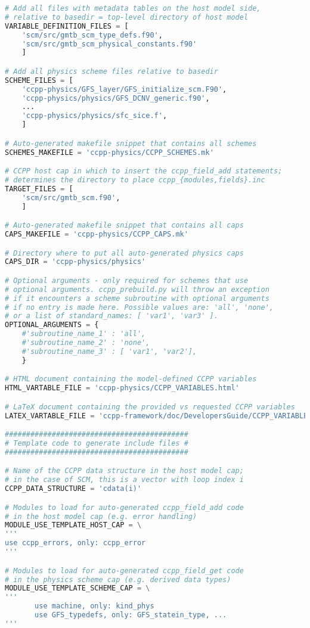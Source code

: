\begin{lstlisting}[language=python]
# Add all files with metadata tables on the host model side,
# relative to basedir = top-level directory of host model
VARIABLE_DEFINITION_FILES = [
    'scm/src/gmtb_scm_type_defs.f90',
    'scm/src/gmtb_scm_physical_constants.f90'
    ]

# Add all physics scheme files relative to basedir
SCHEME_FILES = [
    'ccpp-physics/GFS_layer/GFS_initialize_scm.F90',
    'ccpp-physics/physics/GFS_DCNV_generic.f90',
    ...
    'ccpp-physics/physics/sfc_sice.f',
    ]

# Auto-generated makefile snippet that contains all schemes
SCHEMES_MAKEFILE = 'ccpp-physics/CCPP_SCHEMES.mk'

# CCPP host cap in which to insert the ccpp_field_add statements;
# determines the directory to place ccpp_{modules,fields}.inc
TARGET_FILES = [
    'scm/src/gmtb_scm.f90',
    ]

# Auto-generated makefile snippet that contains all caps
CAPS_MAKEFILE = 'ccpp-physics/CCPP_CAPS.mk'

# Directory where to put all auto-generated physics caps
CAPS_DIR = 'ccpp-physics/physics'

# Optional arguments - only required for schemes that use
# optional arguments. ccpp_prebuild.py will throw an exception
# if it encounters a scheme subroutine with optional arguments
# if no entry is made here. Possible values are: 'all', 'none',
# or a list of standard_names: [ 'var1', 'var3' ].
OPTIONAL_ARGUMENTS = {
    #'subroutine_name_1' : 'all',
    #'subroutine_name_2' : 'none',
    #'subroutine_name_3' : [ 'var1', 'var2'],
    }

# HTML document containing the model-defined CCPP variables
HTML_VARTABLE_FILE = 'ccpp-physics/CCPP_VARIABLES.html'

# LaTeX document containing the provided vs requested CCPP variables
LATEX_VARTABLE_FILE = 'ccpp-framework/doc/DevelopersGuide/CCPP_VARIABLES.tex'

###########################################
# Template code to generate include files #
###########################################

# Name of the CCPP data structure in the host model cap;
# in the case of SCM, this is a vector with loop index i
CCPP_DATA_STRUCTURE = 'cdata(i)'

# Modules to load for auto-generated ccpp_field_add code
# in the host model cap (e.g. error handling)
MODULE_USE_TEMPLATE_HOST_CAP = \
'''
use ccpp_errors, only: ccpp_error
'''

# Modules to load for auto-generated ccpp_field_get code
# in the physics scheme cap (e.g. derived data types)
MODULE_USE_TEMPLATE_SCHEME_CAP = \
'''
       use machine, only: kind_phys
       use GFS_typedefs, only: GFS_statein_type, ...
'''
\end{lstlisting}

